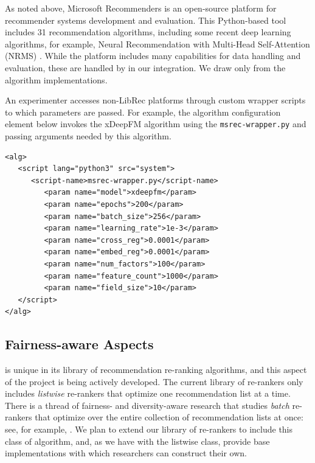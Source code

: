 
As noted above, Microsoft Recommenders \cite{MicrosoftRecommenders} is an open-source platform for recommender systems development and evaluation. This Python-based tool includes 31 recommendation algorithms, including some recent deep learning algorithms, for example, Neural Recommendation with Multi-Head Self-Attention (NRMS) \cite{wu2019neural}. While the platform includes many capabilities for data handling and evaluation, these are handled by \libauto{} in our integration. We draw only from the algorithm implementations. 

An experimenter accesses non-LibRec platforms through custom wrapper scripts to which parameters are passed. For example, the algorithm configuration element below invokes the xDeepFM  algorithm using the \texttt{msrec-wrapper.py} and passing arguments needed by this algorithm.

{\small
\begin{verbatim}
<alg>
   <script lang="python3" src="system">
      <script-name>msrec-wrapper.py</script-name>
         <param name="model">xdeepfm</param>
         <param name="epochs">200</param>
         <param name="batch_size">256</param>
         <param name="learning_rate">1e-3</param>
         <param name="cross_reg">0.0001</param>
         <param name="embed_reg">0.0001</param>
         <param name="num_factors">100</param>
         <param name="feature_count">1000</param>
         <param name="field_size">10</param>
   </script>
</alg>
\end{verbatim}}

\subsection{Fairness-aware Aspects}

\libauto{} is unique in its library of recommendation re-ranking algorithms, and this aspect of the project is being actively developed. The current library of re-rankers only includes \textit{listwise} re-rankers that optimize one recommendation list at a time. There is a thread of fairness- and diversity-aware research that studies \textit{batch} re-rankers that optimize over the entire collection of recommendation lists at once: see, for example, \cite{surer2018multistakeholder,patro2020fairrec,mansoury2020fairmatch}. We plan to extend our library of re-rankers to include this class of algorithm, and, as we have with the listwise class, provide base implementations with which researchers can construct their own.

